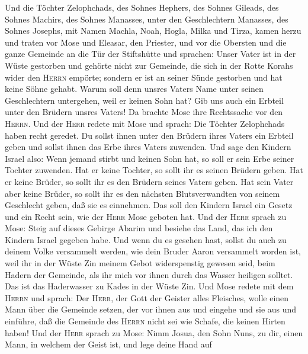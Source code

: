  Und die Töchter Zelophchads, des Sohnes Hephers, des
Sohnes Gileads, des Sohnes Machirs, des Sohnes Manasses, unter den
Geschlechtern Manasses, des Sohnes Josephs, mit Namen Machla, Noah,
Hogla, Milka und Tirza,  kamen herzu und traten vor Mose
und Eleasar, den Priester, und vor die Obersten und die ganze Gemeinde
an die Tür der Stiftshütte und sprachen:  Unser Vater ist
in der Wüste gestorben und gehörte nicht zur Gemeinde, die sich in der
Rotte Korahs wider den \textsc{Herrn} empörte; sondern er ist an seiner
Sünde gestorben und hat keine Söhne gehabt.  Warum soll
denn unsres Vaters Name unter seinen Geschlechtern untergehen, weil er
keinen Sohn hat? Gib uns auch ein Erbteil unter den Brüdern unsres
Vaters!  Da brachte Mose ihre Rechtssache vor den
\textsc{Herrn}.  Und der \textsc{Herr} redete mit Mose und
sprach:  Die Töchter Zelophchads haben recht geredet. Du
sollst ihnen unter den Brüdern ihres Vaters ein Erbteil geben und sollst
ihnen das Erbe ihres Vaters zuwenden.  Und sage den
Kindern Israel also: Wenn jemand stirbt und keinen Sohn hat, so soll er
sein Erbe seiner Tochter zuwenden.  Hat er keine Tochter,
so sollt ihr es seinen Brüdern geben.  Hat er keine
Brüder, so sollt ihr es den Brüdern seines Vaters geben. 
Hat sein Vater aber keine Brüder, so sollt ihr es den nächsten
Blutsverwandten von seinem Geschlecht geben, daß sie es einnehmen. Das
soll den Kindern Israel ein Gesetz und ein Recht sein, wie der
\textsc{Herr} Mose geboten hat.  Und der \textsc{Herr}
sprach zu Mose: Steig auf dieses Gebirge Abarim und besiehe das Land,
das ich den Kindern Israel gegeben habe.  Und wenn du es
gesehen hast, sollst du auch zu deinem Volke versammelt werden, wie dein
Bruder Aaron versammelt worden ist,  weil ihr in der
Wüste Zin meinem Gebot widerspenstig gewesen seid, beim Hadern der
Gemeinde, als ihr mich vor ihnen durch das Wasser heiligen solltet. Das
ist das Haderwasser zu Kades in der Wüste Zin.  Und Mose
redete mit dem \textsc{Herrn} und sprach:  Der
\textsc{Herr}, der Gott der Geister alles Fleisches, wolle einen Mann
über die Gemeinde setzen,  der vor ihnen aus und eingehe
und sie aus und einführe, daß die Gemeinde des \textsc{Herrn} nicht sei
wie Schafe, die keinen Hirten haben!  Und der
\textsc{Herr} sprach zu Mose: Nimm Josua, den Sohn Nuns, zu dir, einen
Mann, in welchem der Geist ist,  und lege deine Hand auf
